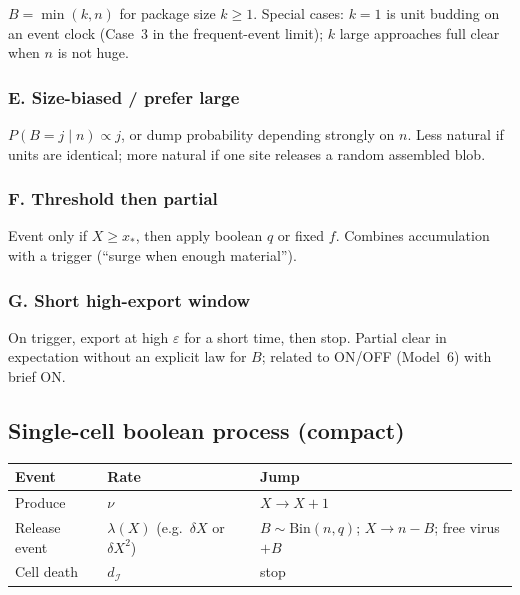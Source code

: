 \documentclass[11pt,a4paper]{article}
\newcommand{\Icell}{\mathcal{I}}
\theoremstyle{plain}
\theoremstyle{definition}
\theoremstyle{remark}
\begin{document}
$B=\min(k,n)$ for package size $k\ge 1$. Special cases: $k=1$ is unit budding
on an event clock (Case~3 in the frequent-event limit); $k$ large approaches
full clear when $n$ is not huge.

\subsubsection*{E. Size-biased / prefer large}

$P(B=j\mid n)\propto j$, or dump probability depending strongly on $n$. Less
natural if units are identical; more natural if one site releases a random
assembled blob.

\subsubsection*{F. Threshold then partial}

Event only if $X\ge x_*$, then apply boolean $q$ or fixed $f$. Combines
accumulation with a trigger (``surge when enough material'').

\subsubsection*{G. Short high-export window}

On trigger, export at high $\varepsilon$ for a short time, then stop. Partial
clear in expectation without an explicit law for $B$; related to ON/OFF
(Model~6) with brief ON.

\subsection{Single-cell boolean process (compact)}

\begin{center}
\renewcommand{\arraystretch}{1.2}
\begin{tabular}{@{}lll@{}}
\toprule
Event & Rate & Jump \\
\midrule
Produce & $\nu$ & $X\to X+1$ \\
Release event & $\lambda(X)$ (e.g.\ $\delta X$ or $\delta X^2$) &
  $B\sim\mathrm{Bin}(n,q)$; $X\to n-B$; free virus $+B$ \\
Cell death & $d_{\Icell}$ & stop \\
\bottomrule
\end{tabular}
\end{center}
\end{document}
